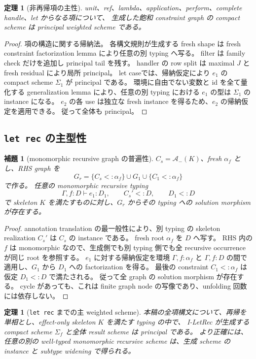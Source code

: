 \documentclass[uplatex,dvipdfmx,a4paper,10.5pt]{jsarticle}
\theoremstyle{jpplain}
\newtheorem{lemma}[definition]{補題}
\newtheorem{theorem}[definition]{定理}
\begin{document}
\begin{theorem}[非再帰項の主性]\label{thm:nonrec-principal}
unit、ref、lambda、application、perform、complete handle、let からなる項について、
生成した飽和 constraint graph の compact scheme は principal weighted scheme である。
\end{theorem}

\begin{proof}
項の構造に関する帰納法。
各構文規則が生成する fresh shape は fresh constraint factorization lemma により任意の別 typing へ写る。
filter は family check だけを追加し principal tail を残す。
handler の row split は maximal $J$ と fresh residual により局所 principal。
let caseでは、帰納仮定により $e_1$ の compact scheme $\Sigma_1$ が principal である。
環境に自由でない変数と id を全て量化する generalization lemma により、任意の別 typing における $e_1$ の型は $\Sigma_1$ の instance になる。
$e_2$ の各 use は独立な fresh instance を得るため、$e_2$ の帰納仮定を適用できる。
従って全体も principal。
\end{proof}

\subsection{\texttt{let rec} の主型性}

\begin{lemma}[monomorphic recursive graph の普遍性]
$C_s=\mathcal A_-(K)$、fresh $\alpha_f$ とし、RHS graph を
\[
  G_r=\{C_s<:\alpha_f\}\cup G_1\cup\{C_1<:\alpha_f\}
\]
で作る。
任意の monomorphic recursive typing
\[
  \Gamma,f:D\vdash e_1:D_1,
  \qquad C_s' <: D,
  \qquad D_1<:D
\]
で skeleton $K$ を満たすものに対し、$G_r$ からその typing への solution morphism が存在する。
\end{lemma}

\begin{proof}
annotation translation の最一般性により、別 typing の skeleton realization $C_s'$ は $C_s$ の instance である。
fresh root $\alpha_f$ を $D$ へ写す。
RHS 内の $f$ は monomorphic なので、生成側でも別 typing 側でも全 recursive occurrence が同じ root を参照する。
$e_1$ に対する帰納仮定を環境 $\Gamma,f:\alpha_f$ と $\Gamma,f:D$ の間で適用し、$G_1$ から $D_1$ への factorization を得る。
最後の constraint $C_1<:\alpha_f$ は仮定 $D_1<:D$ で満たされる。
従って全 graph の solution morphism が存在する。
cycle があっても、これは finite graph node の写像であり、unfolding 回数には依存しない。
\end{proof}

\begin{theorem}[\texttt{let rec} までの主 weighted scheme]\label{thm:letrec-principal}
本稿の全項構文について、再帰を単相とし、effect-only skeleton $K$ を満たす typing の中で、
I-LetRec が生成する compact scheme $\Sigma_f$ と全体 result scheme は principal である。
より正確には、任意の別の well-typed monomorphic recursive scheme は、生成 scheme の instance と subtype widening で得られる。
\end{theorem}
\end{document}
